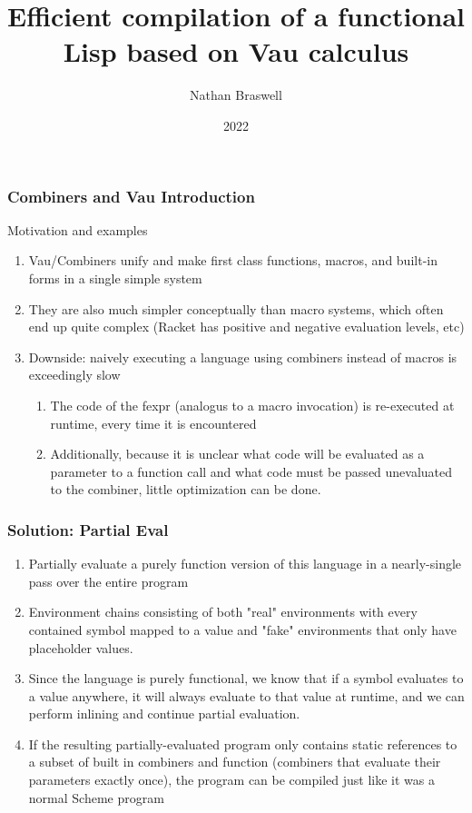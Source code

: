 \documentclass{beamer}
\title{Efficient compilation of a functional Lisp based on Vau calculus}
\author{Nathan Braswell}
\institute{Georgia Tech}
\date{2022}
\begin{document}
\frame{\titlepage}

\begin{frame}
\frametitle{Combiners and Vau Introduction}
Motivation and examples
  \begin{enumerate}
	\item<1-> Vau/Combiners unify and make first class functions, macros, and built-in forms in a single simple system
	\item<2-> They are also much simpler conceptually than macro systems, which often end up quite complex (Racket has positive and negative evaluation levels, etc)
	\item<3-> Downside: naively executing a language using combiners instead of macros is exceedingly slow
	\begin{enumerate}
		\item<4-> The code of the fexpr (analogus to a macro invocation) is re-executed at runtime, every time it is encountered
		\item<5-> Additionally, because it is unclear what code will be evaluated as a parameter to a function call and what code must be passed unevaluated to the combiner, little optimization can be done.
	\end{enumerate}
  \end{enumerate}
\end{frame}

\begin{frame}
\frametitle{Solution: Partial Eval}
  \begin{enumerate}
    \item<1-> Partially evaluate a purely function version of this language in a nearly-single pass over the entire program
    \item<2-> Environment chains consisting of both "real" environments with every contained symbol mapped to a value and "fake" environments that only have placeholder values.
	\item<3-> Since the language is purely functional, we know that if a symbol evaluates to a value anywhere, it will always evaluate to that value at runtime, and we can perform inlining and continue partial evaluation.
	\item<4-> If the resulting partially-evaluated program only contains static references to a subset of built in combiners and function (combiners that evaluate their parameters exactly once), the program can be compiled just like it was a normal Scheme program
  \end{enumerate}
\end{frame}
\end{document}
